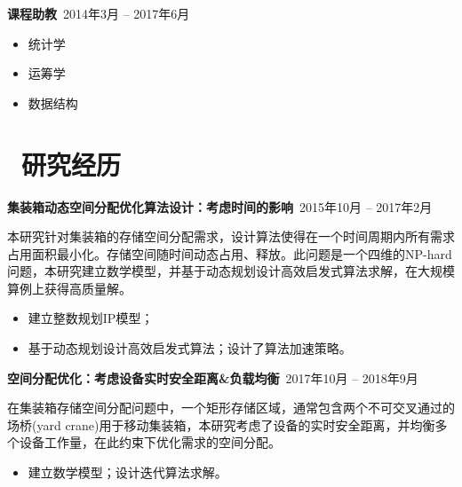\documentclass[11pt]{article}
\begin{document}
\textbf{课程助教}\  \hfill 2014年3月 -- 2017年6月

\begin{itemize}
  \item 统计学
  \item 运筹学
  \item 数据结构
\end{itemize}

\section{\makebox[\widthof{\faGraduationCap}][c]{\color{CVBlue}\faLightbulbO}\ 研究经历}
\textbf{集装箱动态空间分配优化算法设计：考虑时间的影响}\  \hfill 2015年10月 -- 2017年2月

本研究针对集装箱的存储空间分配需求，设计算法使得在一个时间周期内所有需求占用面积最小化。存储空间随时间动态占用、释放。此问题是一个四维的NP-hard问题，本研究建立数学模型，并基于动态规划设计高效启发式算法求解，在大规模算例上获得高质量解。

\begin{itemize}
  \item 建立整数规划IP模型；
  \item 基于动态规划设计高效启发式算法；设计了算法加速策略。
\end{itemize}

\textbf{空间分配优化：考虑设备实时安全距离\&负载均衡}\  \hfill 2017年10月 -- 2018年9月

在集装箱存储空间分配问题中，一个矩形存储区域，通常包含两个不可交叉通过的场桥(yard crane)用于移动集装箱，本研究考虑了设备的实时安全距离，并均衡多个设备工作量，在此约束下优化需求的空间分配。
\begin{itemize}
  \item 建立数学模型；设计迭代算法求解。
\end{itemize}
\end{document}
